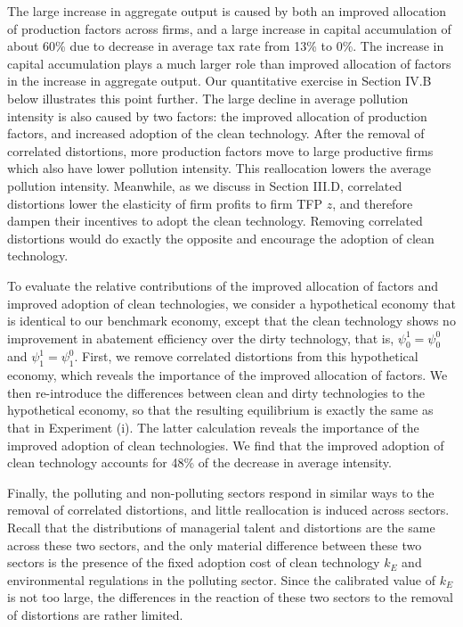 \documentclass[AEJ]{AEA}
\begin{document}
The large increase in aggregate output is caused by both an improved allocation of production factors across firms, and a large increase in capital accumulation of about 60\% due to decrease in average tax rate from 13\% to 0\%. The increase in capital accumulation plays a much larger role than improved allocation of factors in the increase in aggregate output. Our quantitative exercise in Section IV.B below illustrates this point further. The large decline in average pollution intensity is also caused by two factors: the improved allocation of production factors, and increased adoption of the clean technology. After the removal of correlated distortions, more production factors move to large productive firms which also have lower pollution intensity. This reallocation lowers the average pollution intensity. Meanwhile, as we discuss in Section III.D, correlated distortions lower the elasticity of firm profits to firm TFP $z$, and therefore dampen their incentives to adopt the clean technology. Removing correlated distortions would do exactly the opposite and encourage the adoption of clean technology.

To evaluate the relative contributions of the improved allocation of factors and improved adoption of clean technologies, we consider a hypothetical economy that is identical to our benchmark economy, except that the clean technology shows no improvement in abatement efficiency over the dirty technology, that is, $\psi_0^{1} = \psi_0^{0}$ and $\psi_1^{1} = \psi_1^{0}$. First, we remove correlated distortions from this hypothetical economy, which reveals the importance of the improved allocation of factors. We then re-introduce the differences between clean and dirty technologies to the hypothetical economy, so that the resulting equilibrium is exactly the same as that in Experiment (i). The latter calculation reveals the importance of the improved adoption of clean technologies. We find that the improved adoption of clean technology accounts for 48\% of the decrease in average intensity.

Finally, the polluting and non-polluting sectors respond in similar ways to the removal of correlated distortions, and little reallocation is induced across sectors. Recall that the distributions of managerial talent and distortions are the same across these two sectors, and the only material difference between these two sectors is the presence of the fixed adoption cost of clean technology $k_E$ and environmental regulations in the polluting sector. Since the calibrated value of $k_E$ is not too large, the differences in the reaction of these two sectors to the removal of distortions are rather limited.
\end{document}
